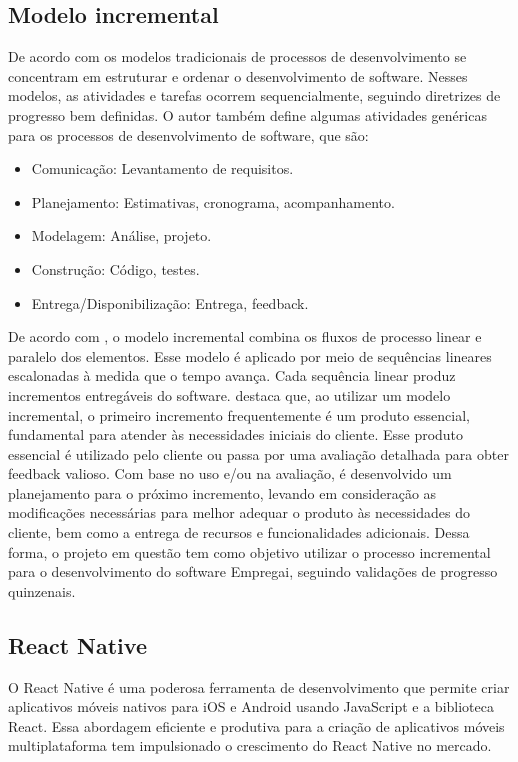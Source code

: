 \subsection{Modelo incremental}

De acordo com \textcite{Pressman2016} os modelos tradicionais de processos de desenvolvimento se concentram em estruturar e ordenar o desenvolvimento de software. 
Nesses modelos, as atividades e tarefas ocorrem sequencialmente, seguindo diretrizes de progresso bem definidas. O autor também define algumas atividades genéricas
para os processos de desenvolvimento de software, que são:
\begin{itemize}[label=$\bullet$]
	\item Comunicação: Levantamento de requisitos.
	\item Planejamento: Estimativas, cronograma, acompanhamento.
	\item Modelagem: Análise, projeto.
	\item Construção: Código, testes.
	\item Entrega/Disponibilização: Entrega, feedback.
	\end{itemize}
	De acordo com \textcite{Pressman2016}, o modelo incremental combina os fluxos de processo linear e paralelo dos elementos. Esse modelo é aplicado por
	meio de sequências lineares escalonadas à medida que o tempo avança. Cada sequência linear produz incrementos entregáveis do software.
	\textcite{Pressman2016} destaca que, ao utilizar um modelo incremental, o primeiro incremento frequentemente é um produto essencial, fundamental 
	para atender às necessidades iniciais do cliente. Esse produto essencial é utilizado pelo cliente ou passa por uma avaliação detalhada para obter feedback valioso. 
	Com base no uso e/ou na avaliação, é desenvolvido um planejamento para o próximo incremento, levando em consideração as modificações necessárias para melhor adequar o 
	produto às necessidades do cliente, bem como a entrega de recursos e funcionalidades adicionais.
	\newline Dessa forma, o projeto em questão tem como objetivo utilizar o processo incremental para o desenvolvimento do software Empregai, seguindo validações de progresso quinzenais.

\subsection{React Native}
O React Native é uma poderosa ferramenta de desenvolvimento que permite criar aplicativos móveis nativos para iOS e Android usando JavaScript e a biblioteca React. Essa abordagem eficiente e produtiva para a criação de aplicativos móveis multiplataforma tem impulsionado o crescimento do React Native no mercado.

